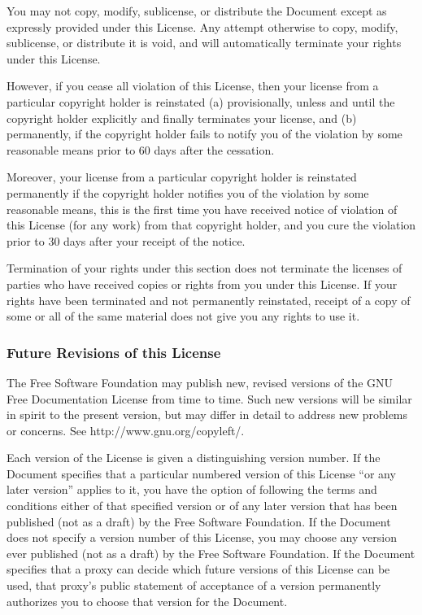 You may not copy, modify, sublicense, or distribute the Document except as expressly provided under this License. Any attempt otherwise to copy, modify, sublicense, or distribute it is void, and will automatically terminate your rights under this License.

However, if you cease all violation of this License, then your license from a particular copyright holder is reinstated (a) provisionally, unless and until the copyright holder explicitly and finally
terminates your license, and (b) permanently, if the copyright holder fails to notify you of the violation by some reasonable means prior to 60 days after the cessation.

Moreover, your license from a particular copyright holder is reinstated permanently if the copyright holder notifies you of the violation by some reasonable means, this is the first time you have received notice of violation of this License (for any work) from that copyright holder, and you cure the violation prior to 30 days after your receipt of the notice.

Termination of your rights under this section does not terminate the licenses of parties who have received copies or rights from you under this License. If your rights have been terminated and not permanently reinstated, receipt of a copy of some or all of the same material does not give you any rights to use it.

\subsubsection{Future Revisions of this License}

The Free Software Foundation may publish new, revised versions of the GNU Free Documentation License from time to time. Such new versions will be similar in spirit to the present version, but may differ in detail to address new problems or concerns. See http://www.gnu.org/copyleft/.

Each version of the License is given a distinguishing version number. If the Document specifies that a particular numbered version of this License ``or any later version'' applies to it, you have the option of following the terms and conditions either of that specified version or of any later version that has been published (not as a draft) by the Free Software Foundation. If the Document does not specify a version number of this License, you may choose any version ever published (not as a draft) by the Free Software Foundation. If the Document specifies that a proxy can decide which future versions of this
License can be used, that proxy’s public statement of acceptance of a version permanently authorizes you to choose that version for the Document.

